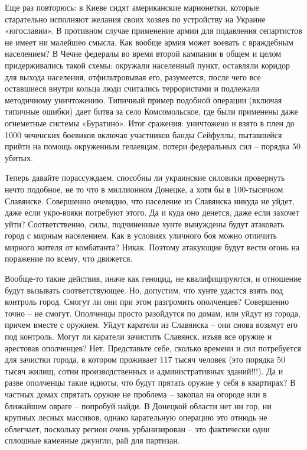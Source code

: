 Еще раз повторюсь: в Киеве сидят американские марионетки, которые старательно
исполняют желания своих хозяев по устройству на Украине «югославии». В
противном случае применение армии для подавления сепартистов не имеет ни
малейшео смысла. Как вообще армия может воевать с враждебным населением? В
Чечне федералы во время второй кампании в общем и целом придерживались такой
схемы: окружали населенный пункт, оставляли коридор для выхода населения,
отфильтровывая его, разумеется, после чего все оставшиеся внутри кольца люди
считались террористами и подлежали методичному уничтожению. Типичный пример
подобной операции (включая типичные ошибки) дает битва за село Комсомольское,
где были применены даже огнеметные системы «Буратино».  Итог сражения:
уничтожено и взято в плен до 1000 чеченских боевиков включая участников банды
Сейфуллы, пытавшейся прийти на помощь окруженным гелаевцам, потери федеральных
сил – порядка 50 убитых.

Теперь давайте порассуждаем, способны ли украинские силовики провернуть нечто
подобное, не то что в миллионном Донецке, а хотя бы в 100-тысячном Славянске.
Совершенно очевидно, что население из Славянска никуда не уйдет, даже если
укро-вояки потребуют этого. Да и куда оно денется, даже если захочет уйти?
Соответственно, силы, подчиненные хунте вынуждены будут атаковать город с
мирным населением. Как в условиях уличного боя можно отличить мирного жителя от
комбатанта? Никак. Поэтому атакующие будут вести огонь на поражение по всему,
что движется.

Вообще-то такие действия, иначе как геноцид, не квалифицируются, и отношение
будут вызывать соответствующее. Но, допустим, что хунте удастся взять под
контроль город. Смогут ли они при этом разгромить ополченцев? Совершенно точно
– не смогут. Ополченцы просто разойдутся по домам, или уйдут из города, причем
вместе с оружием. Уйдут каратели из Славянска – они снова возьмут его под
контроль. Могут ли каратели зачистить Славянск, изъяв все оружие и арестовав
ополченцев? Нет.  Представьте себе, сколько времени и сил потребуется для
зачистки города, в котором проживает 117 тысяч человек (это порядка 50 тысяч
жилищ, сотни производственных и административных зданий!!!). Да и разве
ополченцы такие идиоты, что будут прятать оружие у себя в квартирах? В частных
домах спрятать оружие не проблема – закопал на огороде или в ближайшем овраге –
попробуй найди.  В Донецкой области нет ни гор, ни крупных лесных массивов,
однако карательную операцию это отнюдь не облегчает, поскольку регион очень
урбанизирован – это фактически одни сплошные каменные джунгли, рай для
партизан.

